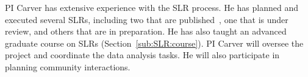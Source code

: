 



PI Carver has extensive experience with the SLR process. He has planned and executed several SLRs, including two that are published~\cite{GursimranSinghWalia_et_al_2009,ByronJWilliams_et_al_2010}, one that is under review, and others that are in preparation. He has also taught an advanced graduate course on SLRs (Section~\ref{sub:SLR:course}).  PI Carver will oversee the project and coordinate the data analysis tasks. He will also participate in planning community interactions.

